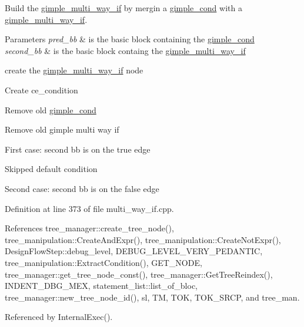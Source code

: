 Build the \hyperlink{structgimple__multi__way__if}{gimple\+\_\+multi\+\_\+way\+\_\+if} by mergin a \hyperlink{structgimple__cond}{gimple\+\_\+cond} with a \hyperlink{structgimple__multi__way__if}{gimple\+\_\+multi\+\_\+way\+\_\+if}. 


\begin{DoxyParams}{Parameters}
{\em pred\+\_\+bb} & is the basic block containing the \hyperlink{structgimple__cond}{gimple\+\_\+cond} \\
\hline
{\em second\+\_\+bb} & is the basic block containg the \hyperlink{structgimple__multi__way__if}{gimple\+\_\+multi\+\_\+way\+\_\+if} \\
\hline
\end{DoxyParams}
create the \hyperlink{structgimple__multi__way__if}{gimple\+\_\+multi\+\_\+way\+\_\+if} node

Create ce\+\_\+condition

Remove old \hyperlink{structgimple__cond}{gimple\+\_\+cond}

Remove old gimple multi way if

First case\+: second bb is on the true edge

Skipped default condition

Second case\+: second bb is on the false edge 

Definition at line 373 of file multi\+\_\+way\+\_\+if.\+cpp.



References tree\+\_\+manager\+::create\+\_\+tree\+\_\+node(), tree\+\_\+manipulation\+::\+Create\+And\+Expr(), tree\+\_\+manipulation\+::\+Create\+Not\+Expr(), Design\+Flow\+Step\+::debug\+\_\+level, D\+E\+B\+U\+G\+\_\+\+L\+E\+V\+E\+L\+\_\+\+V\+E\+R\+Y\+\_\+\+P\+E\+D\+A\+N\+T\+IC, tree\+\_\+manipulation\+::\+Extract\+Condition(), G\+E\+T\+\_\+\+N\+O\+DE, tree\+\_\+manager\+::get\+\_\+tree\+\_\+node\+\_\+const(), tree\+\_\+manager\+::\+Get\+Tree\+Reindex(), I\+N\+D\+E\+N\+T\+\_\+\+D\+B\+G\+\_\+\+M\+EX, statement\+\_\+list\+::list\+\_\+of\+\_\+bloc, tree\+\_\+manager\+::new\+\_\+tree\+\_\+node\+\_\+id(), sl, TM, T\+OK, T\+O\+K\+\_\+\+S\+R\+CP, and tree\+\_\+man.



Referenced by Internal\+Exec().

